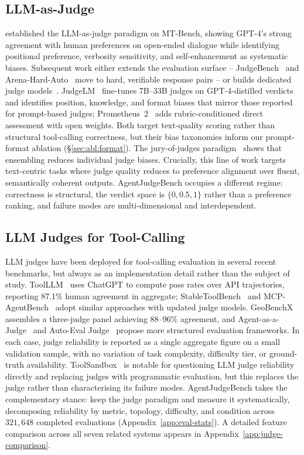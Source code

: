 \subsection{LLM-as-Judge}
\citet{zheng2023judging} established the LLM-as-judge paradigm on MT-Bench, showing GPT-4's strong agreement with human preferences on open-ended dialogue while identifying positional preference, verbosity sensitivity, and self-enhancement as systematic biases. Subsequent work either extends the evaluation surface -- JudgeBench~\citep{tan2025judgebench} and Arena-Hard-Auto~\citep{li2024arenahard} move to hard, verifiable response pairs -- or builds dedicated judge models~\citep{wang2024pandalm,li2024autoj,zhu2023judgelm,kim2024prometheus2}. JudgeLM~\citep{zhu2023judgelm} fine-tunes 7B--33B judges on GPT-4-distilled verdicts and identifies position, knowledge, and format biases that mirror those reported for prompt-based judges; Prometheus~2~\citep{kim2024prometheus2} adds rubric-conditioned direct assessment with open weights. Both target text-quality scoring rather than structural tool-calling correctness, but their bias taxonomies inform our prompt-format ablation (\S\ref{sec:abl:format}). The jury-of-judges paradigm~\citep{verga2024jury} shows that ensembling reduces individual judge biases. Crucially, this line of work targets text-centric tasks where judge quality reduces to preference alignment over fluent, semantically coherent outputs. AgentJudgeBench occupies a different regime: correctness is structural, the verdict space is $\{0, 0.5, 1\}$ rather than a preference ranking, and failure modes are multi-dimensional and interdependent.

\subsection{LLM Judges for Tool-Calling}
LLM judges have been deployed for tool-calling evaluation in several recent benchmarks, but always as an implementation detail rather than the subject of study. ToolLLM~\citep{qin2024toolllm} uses ChatGPT to compute pass rates over API trajectories, reporting 87.1\% human agreement in aggregate; StableToolBench~\citep{guo2024stabletoolbench} and MCP-AgentBench~\citep{guo2025mcpagentbench} adopt similar approaches with updated judge models. GeoBenchX~\citep{krechetova2025geobenchx} assembles a three-judge panel achieving 88--96\% agreement, and Agent-as-a-Judge~\citep{zhuge2024agentjudge} and Auto-Eval Judge~\citep{bhonsle2025autoeval} propose more structured evaluation frameworks. In each case, judge reliability is reported as a single aggregate figure on a small validation sample, with no variation of task complexity, difficulty tier, or ground-truth availability. ToolSandbox~\citep{lu2024toolsandbox} is notable for questioning LLM judge reliability directly and replacing judges with programmatic evaluation, but this replaces the judge rather than characterising its failure modes. AgentJudgeBench takes the complementary stance: keep the judge paradigm and measure it systematically, decomposing reliability by metric, topology, difficulty, and condition across $321{,}648$ completed evaluations (Appendix~\ref{app:eval-stats}). A detailed feature comparison across all seven related systems appears in Appendix~\ref{app:judge-comparison}.
